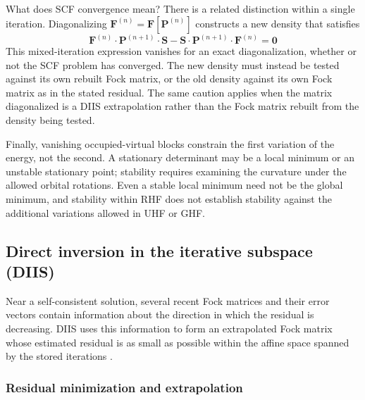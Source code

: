 \documentclass[11pt,a4paper,titlepage]{article}
\numberwithin{equation}{section}
\newcommand{\bF}{\boldsymbol{F}}
\newcommand{\bO}{\boldsymbol{0}}
\newcommand{\bP}{\boldsymbol{P}}
\newcommand{\bS}{\boldsymbol{S}}
\begin{document}
\begin{hfsolution}{What does SCF convergence mean?}
There is a related distinction within a single iteration. Diagonalizing
$\bF^{(n)}=\bF[\bP^{(n)}]$ constructs a new density that satisfies
\begin{equation}
  \bF^{(n)}\cdot\bP^{(n+1)}\cdot\bS
  -\bS\cdot\bP^{(n+1)}\cdot\bF^{(n)}=\bO
\end{equation}
This mixed-iteration expression vanishes for an exact diagonalization,
whether or not the SCF problem has converged. The new density must instead
be tested against its own rebuilt Fock matrix, or the old density against
its own Fock matrix as in the stated residual. The same caution applies
when the matrix diagonalized is a DIIS extrapolation rather than the Fock
matrix rebuilt from the density being tested.

Finally, vanishing occupied-virtual blocks constrain the first variation
of the energy, not the second. A stationary determinant may be a local
minimum or an unstable stationary point; stability requires examining the
curvature under the allowed orbital rotations. Even a stable local minimum
need not be the global minimum, and stability within RHF does not establish
stability against the additional variations allowed in UHF or GHF.
\end{hfsolution}

\subsection{Direct inversion in the iterative subspace (DIIS)}

Near a self-consistent solution, several recent Fock matrices and their error
vectors contain information about the direction in which the residual is
decreasing. DIIS uses this information to form an extrapolated Fock matrix
whose estimated residual is as small as possible within the affine space
spanned by the stored iterations \citep{Pulay1980,Pulay1982}.

\hfBioPulay

\subsubsection{Residual minimization and extrapolation}
\end{document}
